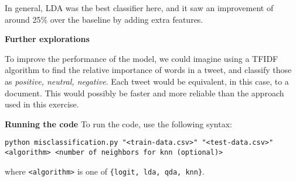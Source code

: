 \documentclass[]{article}
\begin{document}
In general, LDA was the best classifier here, and it saw an improvement of around 25\% over the baseline by adding extra features.


\textbf{Further explorations}

To improve the performance of the model, we could imagine using a TFIDF algorithm to find the relative importance of words in a tweet, and classify those as \textit{positive, neutral, negative}. Each tweet would be equivalent, in this case, to a document. This would possibly be faster and more reliable than the approach used in this exercise.

\textbf{Running the code}
To run the code, use the following syntax:

\texttt{python misclassification.py "<train-data.csv>" "<test-data.csv>" <algorithm> <number of neighbors for knn (optional)>}

where \texttt{<algorithm>} is one of \texttt{\{logit, lda, qda, knn\}}.
\end{document}
